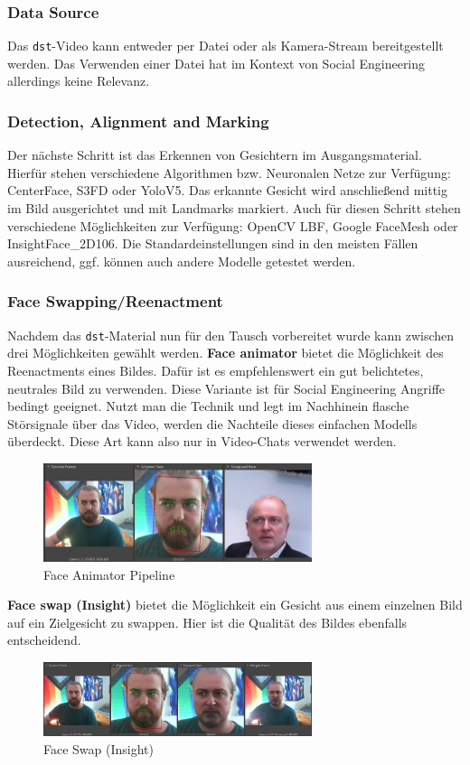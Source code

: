 \subsubsection{Data Source}
Das \texttt{dst}-Video kann entweder per Datei oder als Kamera-Stream bereitgestellt werden.
Das Verwenden einer Datei hat im Kontext von Social Engineering allerdings keine Relevanz.

\subsubsection{Detection, Alignment and Marking}
Der nächste Schritt ist das Erkennen von Gesichtern im Ausgangsmaterial.
Hierfür stehen verschiedene Algorithmen bzw. Neuronalen Netze zur Verfügung: CenterFace, S3FD oder YoloV5.
Das erkannte Gesicht wird anschließend mittig im Bild ausgerichtet und mit Landmarks markiert.
Auch für diesen Schritt stehen verschiedene Möglichkeiten zur Verfügung: OpenCV LBF, Google FaceMesh oder InsightFace\_2D106.
Die Standardeinstellungen sind in den meisten Fällen ausreichend, ggf. können auch andere Modelle getestet werden.

\subsubsection{Face Swapping/Reenactment}
Nachdem das \texttt{dst}-Material nun für den Tausch vorbereitet wurde kann zwischen drei Möglichkeiten gewählt werden.
\textbf{Face animator} bietet die Möglichkeit des Reenactments eines Bildes.
Dafür ist es empfehlenswert ein gut belichtetes, neutrales Bild zu verwenden.
Diese Variante ist für Social Engineering Angriffe bedingt geeignet.
Nutzt man die Technik und legt im Nachhinein flasche Störsignale über das Video, werden die Nachteile dieses einfachen Modells überdeckt.
Diese Art kann also nur in Video-Chats verwendet werden.
\begin{figure}[h]
    \center
    \includegraphics[width=0.7\textwidth]{Bilder/DFLive/face-animator}
    \caption{Face Animator Pipeline}
    \label{fig:dflive-reenactment}
\end{figure}

\textbf{Face swap (Insight)} bietet die Möglichkeit ein Gesicht aus einem einzelnen Bild auf ein Zielgesicht zu swappen.
Hier ist die Qualität des Bildes ebenfalls entscheidend.
\begin{figure}[h]
    \center
    \includegraphics[width=0.7\textwidth]{Bilder/DFLive/Face-swap-ingsight}
    \caption{Face Swap (Insight)}
    \label{fig:dflive-insight-swapping}
\end{figure}

